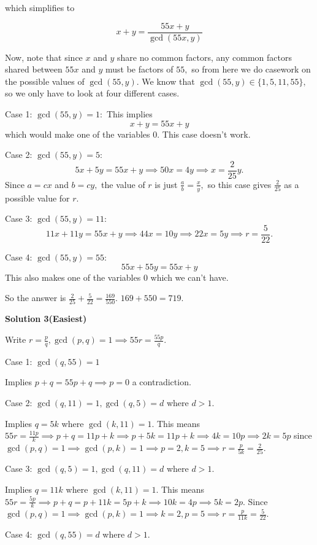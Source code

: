 \begin{enumerate}
 which simplifies to 

 
 \[x + y = \frac{55x + y}{\gcd(55x,y)}\]

 Now, note that since $x$ and $y$ share no common factors, any common factors shared between $55x$ and $y$ must be factors of $55,$ so from here we do casework on the possible values of $\gcd(55,y).$ We know that $\gcd(55,y) \in \{1, 5, 11, 55\},$ so we only have to look at four different cases. 

 Case 1: $\gcd(55,y) = 1:$ This implies 
 \[x + y = 55x + y\] which would make one of the variables $0.$ This case doesn't work. 

 Case 2: $\gcd(55,y) = 5:$ 
 \[5x + 5y = 55x + y \implies 50x = 4y \implies x = \frac{2}{25}y.\] Since $a = cx$ and $b = cy,$ the value of $r$ is just $\frac{a}{b} = \frac{x}{y},$ so this case gives $\frac{2}{25}$ as a possible value for $r$. 

 Case 3: $\gcd(55,y) = 11:$ 
 \[11x + 11y = 55x + y \implies 44x = 10y \implies 22x = 5y \implies r = \frac{5}{22}.\] 

 Case 4: $\gcd(55,y) = 55:$ 
 \[55x + 55y = 55x + y\] This also makes one of the variables $0$ which we can't have. 

 So the answer is $\frac{2}{25} + \frac{5}{22} = \frac{169}{550}.$
$169 + 550 = \boxed{719}.$




\textbf{Solution 3(Easiest)}

Write $r = \frac{p}{q}, \gcd(p, q) = 1 \implies 55r = \frac{55p}{q}$. 

 Case 1: $\gcd(q, 55) = 1$

 Implies $p + q = 55p + q \implies p = 0$ a contradiction.

 Case 2: $\gcd(q, 11) = 1, \gcd(q, 5) = d$ where $d > 1$.

 Implies $q = 5k$ where $\gcd(k, 11) = 1$. This means $55r = \frac{11p}{k} \implies p + q = 11p + k \implies p + 5k = 11p + k \implies 4k = 10p \implies 2k = 5p$ since $\gcd(p, q) = 1 \implies \gcd(p, k) = 1 \implies p = 2, k = 5 \implies r = \frac{p}{5k} = \frac{2}{25}$.

 Case 3: $\gcd(q, 5) = 1, \gcd(q, 11) = d$ where $d > 1$.

 Implies $q = 11k$ where $\gcd(k, 11) = 1$. This means $55r = \frac{5p}{k} \implies p + q = p + 11k = 5p + k \implies 10k = 4p \implies 5k = 2p$. Since $\gcd(p, q) = 1 \implies \gcd(p, k) = 1 \implies k = 2, p = 5 \implies r = \frac{p}{11k} = \frac{5}{22}$.

 Case 4: $\gcd(q, 55) = d$ where $d > 1$.


\end{enumerate}
